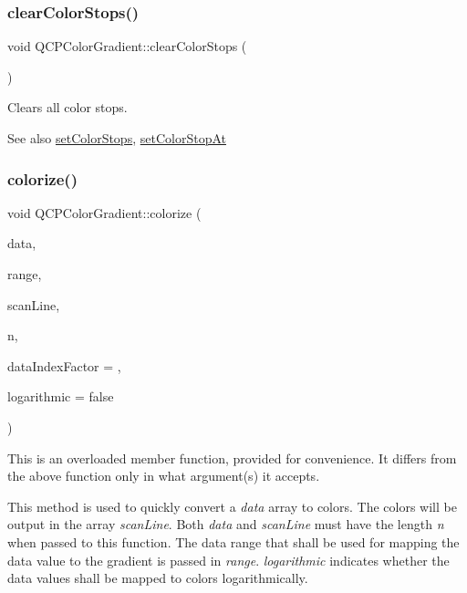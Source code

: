 \subsubsection{\texorpdfstring{clear\+Color\+Stops()}{clearColorStops()}}
{\footnotesize\ttfamily void Q\+C\+P\+Color\+Gradient\+::clear\+Color\+Stops (\begin{DoxyParamCaption}{ }\end{DoxyParamCaption})}

Clears all color stops.

\begin{DoxySeeAlso}{See also}
\hyperlink{class_q_c_p_color_gradient_a724e828aa6f0ba5011a9392477c35d3a}{set\+Color\+Stops}, \hyperlink{class_q_c_p_color_gradient_a3b48be5e78079db1bb2a1188a4c3390e}{set\+Color\+Stop\+At} 
\end{DoxySeeAlso}
\mbox{\label{class_q_c_p_color_gradient_aaf423ceb943e177b0ed2c48c811d83dc}} 
\subsubsection{\texorpdfstring{colorize()}{colorize()}\hspace{0.1cm}{\footnotesize\ttfamily [1/2]}}
{\footnotesize\ttfamily void Q\+C\+P\+Color\+Gradient\+::colorize (\begin{DoxyParamCaption}\item[{const double $\ast$}]{data,  }\item[{const \hyperlink{class_q_c_p_range}{Q\+C\+P\+Range} \&}]{range,  }\item[{Q\+Rgb $\ast$}]{scan\+Line,  }\item[{int}]{n,  }\item[{int}]{data\+Index\+Factor = {},  }\item[{bool}]{logarithmic = {\ttfamily false} }\end{DoxyParamCaption})}

This is an overloaded member function, provided for convenience. It differs from the above function only in what argument(s) it accepts.

This method is used to quickly convert a {\itshape data} array to colors. The colors will be output in the array {\itshape scan\+Line}. Both {\itshape data} and {\itshape scan\+Line} must have the length {\itshape n} when passed to this function. The data range that shall be used for mapping the data value to the gradient is passed in {\itshape range}. {\itshape logarithmic} indicates whether the data values shall be mapped to colors logarithmically.

